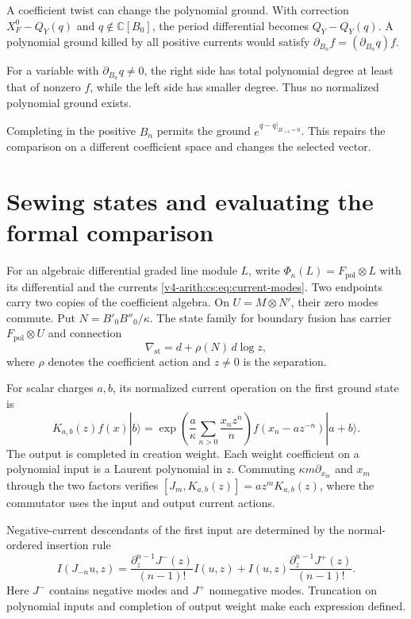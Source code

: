 A coefficient twist can change the polynomial ground. With correction
\(X_F^0-Q_Y(q)\) and \(q\notin\mathbb C[B_0]\), the period differential
becomes \(Q_Y-Q_Y(q)\). A polynomial ground killed by all positive currents
would satisfy \(\partial_{B_n}f=(\partial_{B_n}q)f\).

For a variable with \(\partial_{B_n}q\ne0\), the right side has total
polynomial degree at least that of nonzero \(f\), while the left side has
smaller degree. Thus no normalized polynomial ground exists.

Completing in the positive \(B_n\) permits the ground
\(e^{q-q|_{B_{>0}=0}}\). This repairs the comparison on a different
coefficient space and changes the selected vector.

\section{Sewing states and evaluating the formal comparison}
\label{v4-arith:cs:sewing}

For an algebraic differential graded line module \(L\), write
\(\Phi_\kappa(L)=F_{\mathrm{pol}}\otimes L\) with its differential and the
currents \eqref{v4-arith:cs:eq:current-modes}. Two endpoints carry two
copies of the coefficient algebra. On \(U=M\otimes N'\), their zero modes
commute. Put \(N=B'_0B''_0/\kappa\). The state family for boundary fusion
has carrier \(F_{\mathrm{pol}}\otimes U\) and connection
\begin{equation}
 \nabla_{\mathrm{st}}=d+\rho(N)\,d\log z,
 \label{v4-arith:cs:eq:state-connection}
\end{equation}
where \(\rho\) denotes the coefficient action and \(z\ne0\) is the
separation.

For scalar charges \(a,b\), its normalized current operation on the first
ground state is
\begin{equation}
 K_{a,b}(z)f(x)|b\rangle
 =\exp\left(\frac a\kappa
                 \sum_{n>0}\frac{x_nz^n}{n}\right)
       f(x_n-az^{-n})|a+b\rangle.
 \label{v4-arith:cs:eq:normalized-sewing}
\end{equation}
The output is completed in creation weight. Each weight coefficient on a
polynomial input is a Laurent polynomial in \(z\). Commuting \(\kappa
m\partial_{x_m}\) and \(x_m\) through the two factors verifies \([
J_m,K_{a,b}(z)]=az^mK_{a,b}(z)\), where the commutator uses the input and
output current actions.

Negative-current descendants of the first input are determined by the
normal-ordered insertion rule
\[
 I(J_{-n}u,z)=
 \frac{\partial_z^{n-1}J^-(z)}{(n-1)!}I(u,z)
 +I(u,z)\frac{\partial_z^{n-1}J^+(z)}{(n-1)!}.
\]
Here \(J^-\) contains negative modes and \(J^+\) nonnegative modes.
Truncation on polynomial inputs and completion of output weight make each
expression defined.

